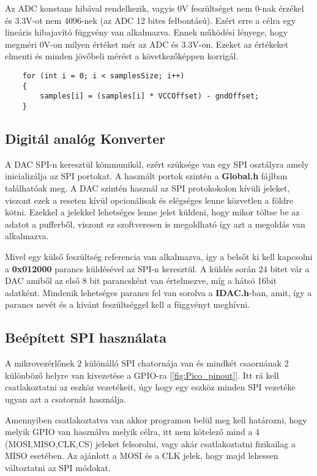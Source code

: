 Az ADC konstans hibával rendelkezik, vagyis 0V feszültséget nem 0-nak érzékel
és 3.3V-ot nem 4096-nek (az ADC 12 bites felbontású). Ezért erre a célra egy
lineáris hibajavító függvény van alkalmazva. Ennek működési lényege, hogy
megméri 0V-on milyen értéket mér az ADC és 3.3V-on. Ezeket az értékeket elmenti
és minden jövőbeli mérést a következőképpen korrigál.


\begin{lstlisting}
    for (int i = 0; i < samplesSize; i++)
    {
        samples[i] = (samples[i] * VCCOffset) - gndOffset;
    }
\end{lstlisting}

\subsection{Digitál analóg Konverter}

A DAC SPI-n keresztül kömmunikál, ezért
szüksége van egy SPI osztályra amely inicializálja az 
SPI portokat. A használt portok szintén a \textbf{Global.h}
fájlban találhatóak meg. A DAC szintén használ az SPI protokokolon
kívüli jeleket, viszont ezek a reseten kívül opcionálisak és 
elégséges lenne közvetlen a földre kötni. Ezekkel a jelekkel
lehetséges lenne jelet küldeni, hogy mikor töltse be az adatot
a pufferből, viszont ez szoftveresen is megoldható így azt a megoldás
van alkalmazva.

Mivel egy külső feszültség referencia van alkalmazva, így a belsőt
ki kell kapcsolni a \textbf{0x012000} parancs küldésével az SPI-n keresztül.
A küldés során 24 bitet vár a DAC amiből az első 8 bit parancsként
van értelmezve, míg a hátsó 16bit adatként. Mindenik lehetséges parancs
fel van sorolva a \textbf{IDAC.h}-ban, amit, így a parancs nevét és a 
kívánt feszültséggel kell a függvényt meghívni.





\subsection{Beépített SPI használata}

A mikrovezérlőnek 2 különálló SPI chatornája van és mindkét csaornának 2 különböző
helyre van kivezetése a GPIO-ra [\ref{fig:Pico_pinout}]. Itt rá kell csatlakoztatni az eszköz vezetékeit, úgy
hogy egy eszköz minden SPI vezetéke ugyan azt a csatornát használja.

Amennyiben csatlakoztatva van akkor programon belül meg kell határozni, hogy 
melyik GPIO van használva melyik célra, itt nem kötelező mind a 4 (MOSI,MISO,CLK,CS)
jeleket felsorolni, vagy akár csatlakoztatni fizikailag a MISO esetében. Az 
ajánlott a MOSI és a CLK jelek, hogy majd lehessen változtatni az SPI módokat.

